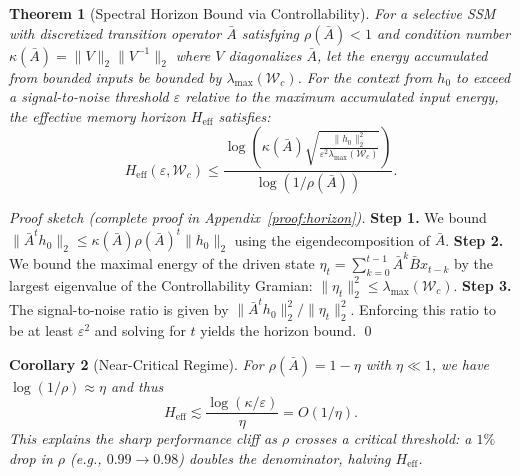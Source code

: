 \documentclass[10pt,twocolumn]{article}
\newtheorem{theorem}{Theorem}
\newtheorem{corollary}[theorem]{Corollary}
\begin{document}
\begin{theorem}[Spectral Horizon Bound via Controllability]
\label{thm:horizon}
For a selective SSM with discretized transition operator $\bar{A}$ satisfying $\rho(\bar{A})<1$ and condition number $\kappa(\bar{A}) = \|V\|_2 \|V^{-1}\|_2$ where $V$ diagonalizes $\bar{A}$, let the energy accumulated from bounded inputs be bounded by $\lambda_{\max}(\mathcal{W}_c)$. For the context from $h_0$ to exceed a signal-to-noise threshold $\varepsilon$ relative to the maximum accumulated input energy, the effective memory horizon $H_{\text{eff}}$ satisfies:
\begin{equation}
H_{\text{eff}}(\varepsilon, \mathcal{W}_c) \le \frac{\log\left( \kappa(\bar{A}) \sqrt{\frac{\|h_0\|_2^2}{\varepsilon^2 \lambda_{\max}(\mathcal{W}_c)}} \right)}{\log(1/\rho(\bar{A}))}.
\label{eq:horizon_main}
\end{equation}
\end{theorem}

\begin{proof}[Proof sketch (complete proof in Appendix~\ref{proof:horizon})]
\textbf{Step 1.} We bound $\|\bar{A}^t h_0\|_2 \le \kappa(\bar{A}) \rho(\bar{A})^t \|h_0\|_2$ using the eigendecomposition of $\bar{A}$.
\textbf{Step 2.} We bound the maximal energy of the driven state $\eta_t = \sum_{k=0}^{t-1} \bar{A}^k \bar{B} x_{t-k}$ by the largest eigenvalue of the Controllability Gramian: $\|\eta_t\|_2^2 \le \lambda_{\max}(\mathcal{W}_c)$.
\textbf{Step 3.} The signal-to-noise ratio is given by $\|\bar{A}^t h_0\|_2^2 / \|\eta_t\|_2^2$. Enforcing this ratio to be at least $\varepsilon^2$ and solving for $t$ yields the horizon bound. \qed
\end{proof}

\begin{corollary}[Near-Critical Regime]
\label{cor:nearcritical}
For $\rho(\bar{A}) = 1 - \eta$ with $\eta \ll 1$, we have $\log(1/\rho) \approx \eta$ and thus
\begin{equation}
H_{\text{eff}} \lesssim \frac{\log(\kappa/\varepsilon)}{\eta} = O(1/\eta).
\label{eq:horizon_nearcritical}
\end{equation}
This explains the sharp performance cliff as $\rho$ crosses a critical threshold: a $1\%$ drop in $\rho$ (e.g., $0.99\to 0.98$) doubles the denominator, halving $H_{\text{eff}}$.
\end{corollary}
\end{document}
